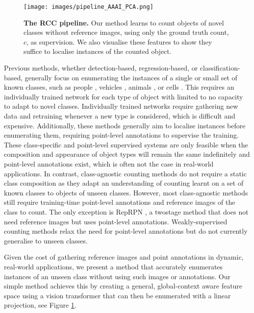 \documentclass[letterpaper, 11pt]{IEEEtran}
\begin{document}
    \begin{figure}[t]
    \centering
    \texttt{[image: images/pipeline\_AAAI\_PCA.png]}
        \caption{
    \textbf{The RCC pipeline.} 
    Our method learns to count objects of novel classes without reference images, using only the ground truth count, $c$, as supervision.
    We also visualise these features to show they suffice to  localise instances of the counted object.
    }
    \label{pipeline}
\end{figure}
    
    Previous methods, whether detection-based, regression-based, or classification-based, generally focus on enumerating the instances of a single or small set of known classes, such as people \cite{wang2015deep, cao2018scale},
    vehicles \cite{mundhenk2016large},
    animals \cite{go2021fine}, 
    or
    cells \cite{xie2018microscopy}.
    This requires an individually trained network for each type of object with limited to no capacity to adapt to novel classes.
    Individually trained networks require gathering new data and retraining whenever a new type is considered, which is difficult and expensive.  
    Additionally, these methods generally aim to localise instances before enumerating them, requiring point-level annotations to supervise the training. 
    These class-specific and point-level supervised systems are only feasible when the composition and appearance of object types will remain the same indefinitely and point-level annotations exist, which is often not the case in real-world applications. 
    In contrast, class-agnostic counting methods \cite{Lu18, ranjan2021Famnet} do not require a static class composition as they adapt an understanding of counting learnt on a set of known classes to objects of unseen classes.
    However, most class-agnostic methods still require training-time point-level annotations and reference images of the class to count. The only exception is RepRPN \cite{ranjan2022exemplar}, a twostage method that does not need reference images but uses point-level annotations.
    Weakly-supervised counting methods \cite{lei2021towards, yang2020weakly} relax the need for point-level annotations but do not currently generalise to unseen classes.

    Given the cost of gathering reference images and point annotations in dynamic, real-world applications, we present a method that accurately enumerates instances of an unseen class without using such images or annotations. Our simple method achieves this by creating a general, global-context aware feature space using a vision transformer that can then be enumerated with a linear projection, see Figure \ref{pipeline}.
\end{document}
